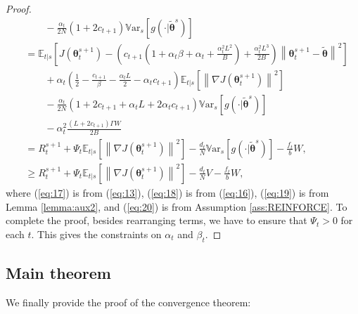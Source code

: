 \documentclass{article}
\theoremstyle{remark}
\theoremstyle{definition}
\newcommand{\norm}[2][\infty]{\left\|#2\right\|_{#1}}
\newcommand{\vtheta}{\boldsymbol{\theta}}
\newcommand{\gradJ}[1]{\nabla J(#1)}
\newcommand{\Ets}[2][t]{\mathbb{E}_{#1\vert s}\left[#2\right]}
\newcommand{\Vars}[1]{{\mathbb{V}\text{ar}}_{s}\left[#1\right]}
\newcommand{\VARRF}{V}
\newcommand{\VARIS}{W}
\begin{document}
\begin{proof}
\begin{align}
	&\qquad-\frac{\alpha_t}{2N}\left(1+2c_{t+1}\right)\Vars{g(\cdot\vert\tilde{\vtheta}^s)} \label{eq:19}\\
	& = \Ets{J(\vtheta_t^{s+1}) - \left(c_{t+1}\left(1+\alpha_t\beta+\alpha_t+\frac{\alpha_t^2L^2}{B}\right)+\frac{\alpha_t^2L^3}{2B}\right)\norm[]{\vtheta_{t}^{s+1}-\tilde{\vtheta}}^2} \nonumber\\
	&\qquad
	+\alpha_t\left(\frac{1}{2}-\frac{c_{t+1}}{\beta}-\frac{\alpha_tL}{2}-\alpha_tc_{t+1}\right)\Ets{\norm[]{\gradJ{\vtheta_t^{s+1}}}^2} \nonumber\\
	&\qquad-\frac{\alpha_t}{2N}\left(1+2c_{t+1}+\alpha_tL+2\alpha_tc_{t+1}\right)\Vars{g(\cdot\vert\tilde{\vtheta}^s)} \nonumber\\
	&\qquad-\alpha_t^2\frac{(L+2c_{t+1})\Gamma\VARIS}{2B} \nonumber\\
	&= R_t^{s+1}
	+\Psi_t\Ets{\norm[]{\gradJ{\vtheta_t^{s+1}}}^2}
	-\frac{d_t}{N}\Vars{g(\cdot\vert\tilde{\vtheta}^s)}
	-\frac{f_t}{b}\VARIS,\nonumber\\
	&\geq R_t^{s+1}
	+\Psi_t\Ets{\norm[]{\gradJ{\vtheta_t^{s+1}}}^2}
	-\frac{d_t}{N}\VARRF
	-\frac{f_t}{b}\VARIS, \label{eq:20}
\end{align}
where (\ref{eq:17}) is from (\ref{eq:13}), (\ref{eq:18}) is from (\ref{eq:16}), (\ref{eq:19}) is from Lemma \ref{lemma:aux2}, and (\ref{eq:20}) is from Assumption \ref{ass:REINFORCE}.
To complete the proof, besides rearranging terms, we have to ensure that $\Psi_t>0$ for each $t$. This gives the constraints on $\alpha_t$ and $\beta_t$.
\end{proof}


\subsection*{Main theorem}
We finally provide the proof of the convergence theorem:
\end{document}
